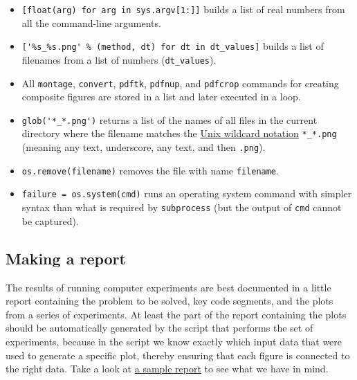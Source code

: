 \documentclass[%
oneside,                 %
final,                   %
10pt]{article}
\begin{document}
\begin{itemize}
 \item \texttt{[float(arg) for arg in sys.argv[1:]]} builds a list of real numbers
   from all the command-line arguments.

 \item \Verb!['%s_%s.png' % (method, dt) for dt in dt_values]! builds a list of
   filenames from a list of numbers (\Verb!dt_values!).

 \item All \texttt{montage}, \texttt{convert}, \texttt{pdftk}, \texttt{pdfnup}, and \texttt{pdfcrop}
   commands for creating
   composite figures are stored in a
   list and later executed in a loop.

 \item \Verb!glob('*_*.png')! returns a list of the names of all files in the
   current directory where the filename matches the \href{{http://en.wikipedia.org/wiki/Glob_(programming)}}{Unix wildcard notation}
   \Verb!*_*.png! (meaning any text, underscore, any text, and then \texttt{.png}).

 \item \texttt{os.remove(filename)} removes the file with name \texttt{filename}.

 \item \texttt{failure = os.system(cmd)} runs an operating system command with
   simpler syntax than what is required by \texttt{subprocess} (but the output
   of \texttt{cmd} cannot be captured).
\end{itemize}

\noindent
\subsection{Making a report}
\label{softeng1:exper:report}

The results of running computer experiments are best documented in a
little report containing the problem to be solved, key code segments,
and the plots from a series of experiments. At least the part of the
report containing the plots should be automatically generated by the
script that performs the set of experiments, because in the script we
know exactly which input data that were used to generate a specific
plot, thereby ensuring that each figure is connected to the
right data. Take a look at \href{{http://tinyurl.com/nc4upel/_static/sphinx-cloud/}}{a sample report}  to see what we have in
mind.

\end{document}
